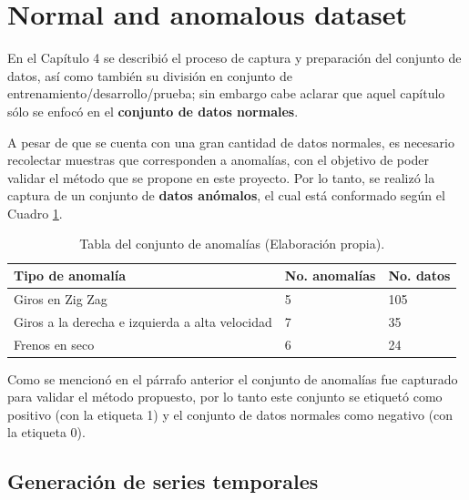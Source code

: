 \section{Normal and anomalous dataset}

En el Cap\'{i}tulo 4 se describi\'{o} el proceso de captura y preparaci\'{o}n del conjunto de datos, as\'{i} como tambi\'{e}n su divisi\'{o}n en conjunto de entrenamiento/desarrollo/prueba; sin embargo cabe aclarar que aquel cap\'{i}tulo s\'{o}lo se enfoc\'{o} en el \textbf{conjunto de datos normales}.%

\vspace{5mm} %

A pesar de que se cuenta con una gran cantidad de datos normales, es necesario recolectar muestras que corresponden a anomal\'{i}as, con el objetivo de poder validar el m\'{e}todo que se propone en este proyecto. Por lo tanto, se realiz\'{o} la captura de un conjunto de \textbf{datos an\'{o}malos}, el cual est\'{a} conformado seg\'{u}n el Cuadro \ref{table:conjunto_anomalias}.

\begin{table}[H]
\centering
\begin{tabular}{|l|l|l|}
\hline
\textbf{Tipo de anomal\'{i}a} & \textbf{No. anomal\'{i}as} & \textbf{No. datos} \\ \hline
Giros en Zig Zag & 5 & 105  \\ \hline
Giros a la derecha e izquierda a alta velocidad & 7 & 35  \\ \hline
Frenos en seco & 6 & 24 \\ \hline
\end{tabular}
\caption{Tabla del conjunto de anomal\'{i}as (Elaboraci\'{o}n propia).}
\label{table:conjunto_anomalias}
\end{table}

\vspace{5mm} %

Como se mencion\'{o} en el p\'{a}rrafo anterior el conjunto de anomal\'{i}as fue capturado para validar el m\'{e}todo propuesto, por lo tanto este conjunto se etiquet\'{o} como positivo (con la etiqueta 1) y el conjunto de datos normales como negativo (con la etiqueta 0).

\subsection{Generaci\'{o}n de series temporales}

